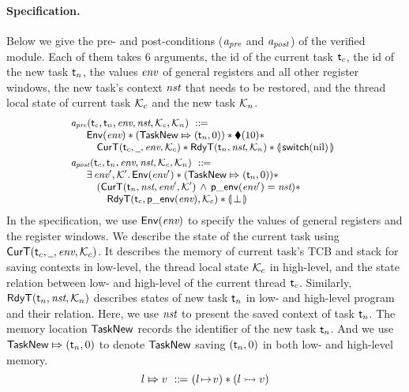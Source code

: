 \paragraph{\textbf{Specification.}}
Below we give the pre- and post-conditions
($\textit{a}_\textit{pre}$ and $\textit{a}_\textit{post}$) of the verified module.
Each of them takes 6 arguments, 
the id of the current task $\textsf{t}_c$, the id of the new 
task $\textsf{t}_n$, the values $\textit{env}$ of general registers and all
other register windows, the new task's context $\textit{nst}$
that needs to be restored, and the thread local state 
of current task $\mathcal{K}_c$ and the new task 
$\mathcal{K}_n$.  
\[
    \small
    \begin{array}{l}
        \textit{a}_\textit{pre}(\textsf{t}_c, \textsf{t}_n, \textit{env}, \textit{nst}, \mathcal{K}_c, \mathcal{K}_n)
        \ ::\!\!{=} \\
        \quad
        \begin{array}{l}
            \mathsf{Env}({\textit{env}}) *
            ({\mathsf{TaskNew}}\Mapsto{(\textsf{t}_n, 0)}) * 
            \blacklozenge({10}) * \\
            \quad
            \textsf{CurT}({\textsf{t}_c}, {\underline{\ \,}}, {\textit{env}}, {\mathcal{K}_c}) * 
            \textsf{RdyT}({\textsf{t}_n}, {\textit{nst}}, {\mathcal{K}_n}) * 
            \llparenthesis {\, \mathsf{switch}(\text{nil}) \,} \rrparenthesis
        \end{array}
        \\
        \\[-8pt]
        \textit{a}_\textit{post}(\textsf{t}_c, \textsf{t}_n, \textit{env}, \textit{nst}, \mathcal{K}_c, \mathcal{K}_n)
        \ ::\!\!{=} \\ 
        \quad
        \begin{array}{l}
            \exists \, \textit{env}', \mathcal{K}'. \, \mathsf{Env}({\textit{env}'}) 
            * ({\mathsf{TaskNew}}\Mapsto{(\textsf{t}_n, 0)}) 
            * \
            \\
            \quad
            (\textsf{CurT}({\textsf{t}_n}, {\textit{nst}}, {\textit{env}'}, {\mathcal{K}'})
            \,\land\,\mathsf{p\_env}({\textit{env}'}) = \textit{nst}) * 
            \\
            \qquad
            \textsf{RdyT}({\textsf{t}_c}, {\mathsf{p\_env}({\textit{env}})}, {\mathcal{K}_c}) * 
            \llparenthesis {\, \perp\,} \rrparenthesis
        \end{array}
    \end{array}
\]
In the specification,
we use $\mathsf{Env}({\textit{env}})$ to specify the values of
general registers and the register windows.
We describe the state
of the current task 
using $\textsf{CurT}({\textsf{t}_c}, {\underline{\ \,}}, {\textit{env}}, {\mathcal{K}_c})$. 
It describes the memory of current task's TCB 
and stack for saving contexts in low-level, 
the thread local state $\mathcal{K}_c$ in high-level, 
and the state relation between low- 
and high-level of the current thread $\textsf{t}_c$.  
Similarly, $\textsf{RdyT}({\textsf{t}_n}, {\textit{nst}}, {\mathcal{K}_n})$  
describes states of new task $\textsf{t}_n$ in low- and high-level 
program and their relation. 
Here, we use $\textit{nst}$ to present the saved context 
of task $\textsf{t}_n$. The memory location 
$\mathsf{TaskNew}$ records the identifier of the new task $\textsf{t}_n$.  
And we use ${\mathsf{TaskNew}}\Mapsto{(\textsf{t}_n, 0)}$ to denote 
$\mathsf{TaskNew}$ saving $(\textsf{t}_n, 0)$ 
in both low- and high-level memory. 
\[
    \relmsto{\loc}{\val} \ \define \ 
    (\msto{\loc}{\val}) \sepstar (\hmsto{\loc}{\val})
\]

